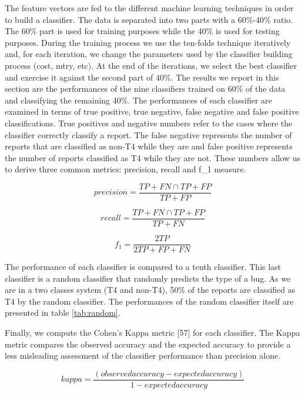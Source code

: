 \documentclass[12pt]{report}
\begin{document}
The feature vectors are fed to the different machine learning techniques
in order to build a classifier. The data is separated into two parts
with a 60\%-40\% ratio. The 60\% part is used for training purposes
while the 40\% is used for testing purposes. During the training process
we use the ten-folds technique iteratively and, for each iteration, we
change the parameters used by the classifier building process (cost,
mtry, etc). At the end of the iterations, we select the best classifier
and exercise it against the second part of 40\%. The results we report
in this section are the performances of the nine classifiers trained on
60\% of the data and classifying the remaining 40\%. The performances of
each classifier are examined in terms of true positive, true negative,
false negative and false positive classifications. True positives and
negative numbers refer to the cases where the classifier correctly
classify a report. The false negative represents the number of reports
that are classified as non-T4 while they are and false positive
represents the number of reports classified as T4 while they are not.
These numbers allow us to derive three common metrics: precision, recall
and f\_1 measure.

\begin{equation}
precision = \frac{TP+FN \cap TP+FP}{TP+FP}
\end{equation}

\begin{equation}
recall = \frac{TP+FN \cap TP+FP}{TP+FN}
\end{equation}

\begin{equation}
f_1 = \frac{2TP}{2TP + FP + FN}
\end{equation}

The performance of each classifier is compared to a tenth classifier.
This last classifier is a random classifier that randomly predicts the
type of a bug. As we are in a two classes system (T4 and non-T4), 50\%
of the reports are classified as T4 by the random classifier. The
performances of the random classifier itself are presented in table
\ref{tab:random}.

Finally, we compute the Cohen's Kappa metric {[}57{]} for each
classifier. The Kappa metric compares the observed accuracy and the
expected accuracy to provide a less misleading assessment of the
classifier performance than precision alone.

\begin{equation}
kappa = \frac{(observed accuracy - expected accuracy)}{1 - expected accuracy}
\end{equation}
\end{document}
